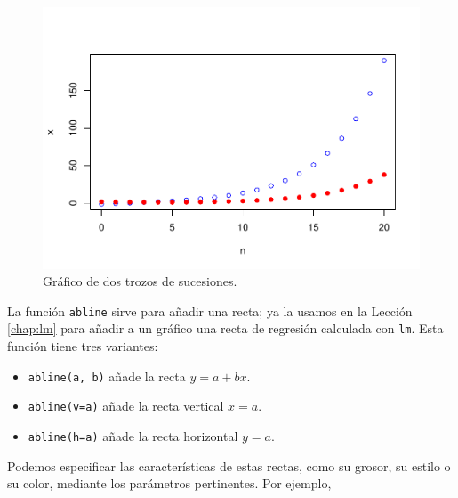 \documentclass[
]{book}
\providecommand{\tightlist}{%
  \setlength{\itemsep}{0pt}\setlength{\parskip}{0pt}}
\theoremstyle{definition}
\theoremstyle{definition}
\theoremstyle{definition}
\theoremstyle{remark}
\begin{document}
\begin{figure}

{\centering \includegraphics[width=0.9\linewidth]{07chap06_Graficos_I_files/figure-latex/expoints2-1} 

}

\caption{Gráfico de dos trozos de sucesiones.}\label{fig:expoints2}
\end{figure}

La función \texttt{abline} sirve para añadir una recta; ya la usamos en la Lección \ref{chap:lm} para añadir a un gráfico una recta de regresión calculada con \texttt{lm}. Esta función tiene tres
variantes:

\begin{itemize}
\tightlist
\item
  \texttt{abline(a,\ b)} añade la recta \(y=a+bx\).
\item
  \texttt{abline(v=a)} añade la recta vertical \(x=a\).
\item
  \texttt{abline(h=a)} añade la recta horizontal \(y=a\).
\end{itemize}

Podemos especificar las características de estas rectas, como su grosor, su estilo o su color, mediante los
parámetros pertinentes. Por ejemplo,
\end{document}
